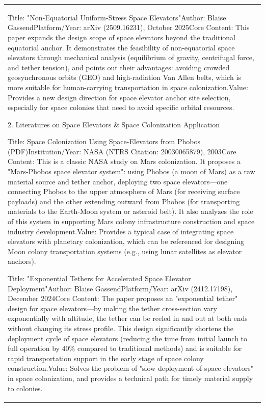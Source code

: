 \begin{longtable}[]{@{}
  >{\raggedright\arraybackslash}p{}@{}}
Title: "Non-Equatorial Uniform-Stress Space Elevators"Author: Blaise
GassendPlatform/Year: arXiv (2509.16231), October 2025Core Content: This
paper expands the design scope of space elevators beyond the traditional
equatorial anchor. It demonstrates the feasibility of non-equatorial
space elevators through mechanical analysis (equilibrium of gravity,
centrifugal force, and tether tension), and points out their advantages:
avoiding crowded geosynchronous orbits (GEO) and high-radiation Van
Allen belts, which is more suitable for human-carrying transportation in
space colonization.Value: Provides a new design direction for space
elevator anchor site selection, especially for space colonies that need
to avoid specific orbital resources.

2. Literatures on Space Elevators \& Space Colonization Application

Title: Space Colonization Using Space-Elevators from Phobos
(PDF)Institution/Year: NASA (NTRS Citation: 20030065879), 2003Core
Content: This is a classic NASA study on Mars colonization. It proposes
a "Mars-Phobos space elevator system": using Phobos (a moon of Mars) as
a raw material source and tether anchor, deploying two space
elevators---one connecting Phobos to the upper atmosphere of Mars (for
receiving surface payloads) and the other extending outward from Phobos
(for transporting materials to the Earth-Moon system or asteroid belt).
It also analyzes the role of this system in supporting Mars colony
infrastructure construction and space industry development.Value:
Provides a typical case of integrating space elevators with planetary
colonization, which can be referenced for designing Moon colony
transportation systems (e.g., using lunar satellites as elevator
anchors).

Title: "Exponential Tethers for Accelerated Space Elevator
Deployment"Author: Blaise GassendPlatform/Year: arXiv (2412.17198),
December 2024Core Content: The paper proposes an "exponential tether"
design for space elevators---by making the tether cross-section vary
exponentially with altitude, the tether can be reeled in and out at both
ends without changing its stress profile. This design significantly
shortens the deployment cycle of space elevators (reducing the time from
initial launch to full operation by 40\% compared to traditional
methods) and is suitable for rapid transportation support in the early
stage of space colony construction.Value: Solves the problem of "slow
deployment of space elevators" in space colonization, and provides a
technical path for timely material supply to colonies.


\end{longtable}
